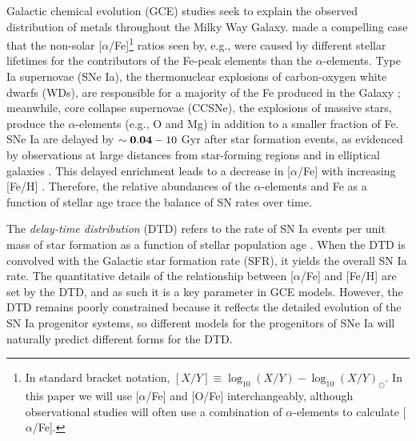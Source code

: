\documentclass[twocolumn,twocolappendix,linenumbers]{aastex631}
\newcommand{\aFe}{[$\alpha$/Fe]\xspace}
\begin{document}
Galactic chemical evolution (GCE) studies seek to explain the observed distribution of metals throughout the Milky Way Galaxy. \citet{Tinsley1979-StellarLifetimes} made a compelling case that the non-solar \aFe\footnote{
    In standard bracket notation, $[X/Y]\equiv \log_{10}(X/Y) - \log_{10}(X/Y)_{\odot}$. In this paper we will use \aFe and [O/Fe] interchangeably, although observational studies will often use a combination of $\alpha$-elements to calculate \aFe.
} ratios seen by, e.g., \citet{Wallerstein1962-GDwarfAbundances} were caused by different stellar lifetimes for the contributors of the Fe-peak elements than the $\alpha$-elements. Type Ia supernovae (SNe Ia), the thermonuclear explosions of carbon-oxygen white dwarfs (WDs), are responsible for a majority of the Fe produced in the Galaxy \citep{Matteucci1986-SupernovaEnrichment}; meanwhile, core collapse supernovae (CCSNe), the explosions of massive stars, produce the $\alpha$-elements (e.g., O and Mg) in addition to a smaller fraction of Fe. SNe Ia are delayed by $\sim{\bf 0.04}-10$ Gyr after star formation events, as evidenced by observations at large distances from star-forming regions and in elliptical galaxies \citep[e.g.,][]{Maza1976-SNStatistics}. This delayed enrichment leads to a decrease in \aFe with increasing [Fe/H] \citep{Matteucci1986-SupernovaEnrichment}. Therefore, the relative abundances of the $\alpha$-elements and Fe as a function of stellar age trace the balance of SN rates over time.

The {\it delay-time distribution} (DTD) refers to the rate of SN Ia events per unit mass of star formation as a function of stellar population age \citep[for a review, see Section 3.5 of][]{Maoz2014-Review}. When the DTD is convolved with the Galactic star formation rate (SFR), it yields the overall SN Ia rate. The quantitative details of the relationship between \aFe and [Fe/H] are set by the DTD, and as such it is a key parameter in GCE models. However, the DTD remains poorly constrained because it reflects the detailed evolution of the SN Ia progenitor systems, so different models for the progenitors of SNe Ia will naturally predict different forms for the DTD.
\end{document}
